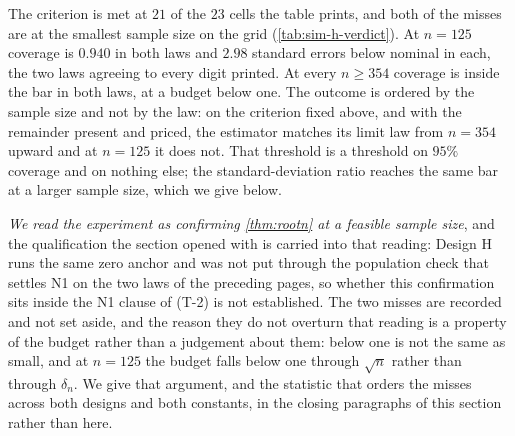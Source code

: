 \documentclass[
  12pt]{article}
\newcommand{\1}[1]{\mathds{1}\left[#1\right]}
\theoremstyle{plain}
\theoremstyle{definition}
\theoremstyle{definition}
\theoremstyle{remark}
\begin{document}
The criterion is met at $21$ of the $23$ cells the table prints, and both of the
misses are at the smallest sample size on the grid (\cref{tab:sim-h-verdict}). At
$n=125$ coverage is
$0.940$ in both laws and $2.98$ standard errors below nominal in each, the two
laws agreeing to every digit printed. At every $n\ge354$ coverage is inside the
bar in both laws, at a budget below one. The outcome is ordered by the sample
size and not by the law: on the criterion fixed above, and with the remainder
present and priced, the estimator matches its limit law from $n=354$ upward and
at $n=125$ it does not. That threshold is a threshold on $95\%$ coverage and on
nothing else; the standard-deviation ratio reaches the same bar at a larger
sample size, which we give below.

\emph{We read the experiment as confirming \cref{thm:rootn} at a feasible sample
size}, and the qualification the section opened with is carried into that
reading: Design H runs the same zero anchor and was not put through the
population check that settles N1 on the two laws of the preceding pages, so
whether this confirmation sits inside the N1 clause of (T-2) is not
established. The two misses are
recorded and not set aside, and the reason they do not
overturn that reading is a property of the budget rather than a judgement about
them: below one is not the same as small, and at $n=125$ the budget falls below
one through $\sqrt n$ rather than through $\delta_n$. We give that argument, and
the statistic that orders the misses across both designs and both constants, in
the closing paragraphs of this section rather than here.
\end{document}
